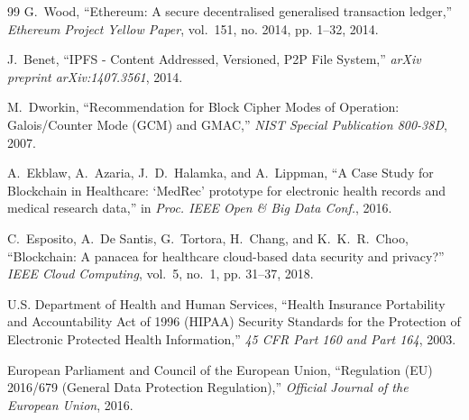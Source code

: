 \documentclass[11pt,a4paper]{article}
\begin{document}
\begin{thebibliography}{99}
G.~Wood, ``Ethereum: A secure decentralised generalised transaction ledger,'' \emph{Ethereum Project Yellow Paper}, vol.~151, no. 2014, pp. 1--32, 2014.

J.~Benet, ``IPFS - Content Addressed, Versioned, P2P File System,'' \emph{arXiv preprint arXiv:1407.3561}, 2014.

M.~Dworkin, ``Recommendation for Block Cipher Modes of Operation: Galois/Counter Mode (GCM) and GMAC,'' \emph{NIST Special Publication 800-38D}, 2007.

A.~Ekblaw, A.~Azaria, J.~D.~Halamka, and A.~Lippman, ``A Case Study for Blockchain in Healthcare: `MedRec' prototype for electronic health records and medical research data,'' in \emph{Proc. IEEE Open \& Big Data Conf.}, 2016.

C.~Esposito, A.~De Santis, G.~Tortora, H.~Chang, and K.~K.~R.~Choo, ``Blockchain: A panacea for healthcare cloud-based data security and privacy?'' \emph{IEEE Cloud Computing}, vol.~5, no.~1, pp. 31--37, 2018.

U.S. Department of Health and Human Services, ``Health Insurance Portability and Accountability Act of 1996 (HIPAA) Security Standards for the Protection of Electronic Protected Health Information,'' \emph{45 CFR Part 160 and Part 164}, 2003.

European Parliament and Council of the European Union, ``Regulation (EU) 2016/679 (General Data Protection Regulation),'' \emph{Official Journal of the European Union}, 2016.
\end{thebibliography}
\end{document}
